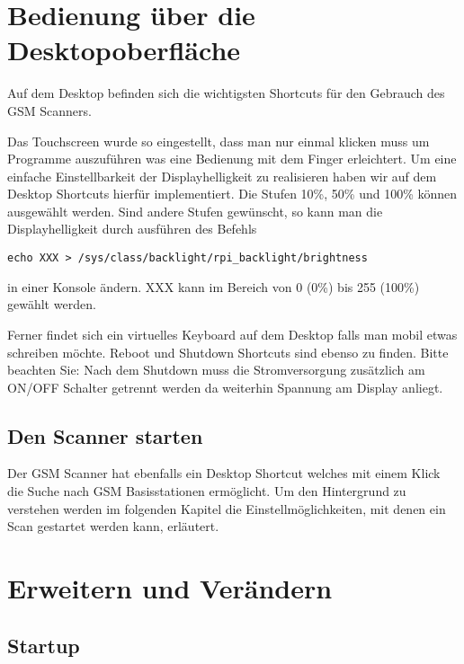 \section{Bedienung über die Desktopoberfläche}

Auf dem Desktop befinden sich die wichtigsten Shortcuts für den Gebrauch des \ac{GSM} Scanners. 



Das Touchscreen wurde so eingestellt, dass man nur einmal klicken muss um Programme auszuführen was eine Bedienung mit dem Finger erleichtert. Um eine einfache Einstellbarkeit der Displayhelligkeit zu realisieren haben wir auf dem Desktop Shortcuts hierfür implementiert. Die Stufen 10\%, 50\% und 100\% können ausgewählt werden. Sind andere Stufen gewünscht, so kann man die Displayhelligkeit durch ausführen des Befehls

\begin{verbatim}
echo XXX > /sys/class/backlight/rpi_backlight/brightness
\end{verbatim}

in einer Konsole ändern. XXX kann im Bereich von 0 (0\%) bis 255 (100\%) gewählt werden. 

Ferner findet sich ein virtuelles Keyboard auf dem Desktop falls man mobil etwas schreiben möchte. Reboot und Shutdown Shortcuts sind ebenso zu finden. Bitte beachten Sie: Nach dem Shutdown muss die Stromversorgung zusätzlich am ON/OFF Schalter getrennt werden da weiterhin Spannung am Display anliegt.

\subsection{Den Scanner starten}

Der \ac{GSM} Scanner hat ebenfalls ein Desktop Shortcut welches mit einem Klick die Suche nach \ac{GSM} Basisstationen ermöglicht. Um den Hintergrund zu verstehen werden im folgenden Kapitel die Einstellmöglichkeiten, mit denen ein Scan gestartet werden kann, erläutert. 

\section{Erweitern und Verändern}
\subsection{Startup}

